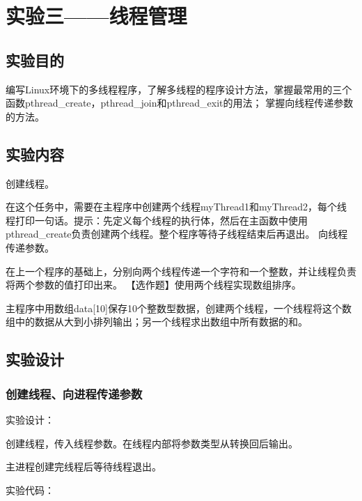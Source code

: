\documentclass{ctexrep}
\begin{document}
\chapter{实验三——线程管理}

\section{实验目的}
\begin{outline}[cenumerate]
    \1 编写Linux环境下的多线程程序，了解多线程的程序设计方法，掌握最常用的三个函数pthread_create，pthread_join和pthread_exit的用法；
    \1 掌握向线程传递参数的方法。
\end{outline}
\section{实验内容}
\begin{outline}[cenumerate]
    \1 创建线程。

在这个任务中，需要在主程序中创建两个线程myThread1和myThread2，每个线程打印一句话。提示：先定义每个线程的执行体，然后在主函数中使用pthread_create负责创建两个线程。整个程序等待子线程结束后再退出。
    \1 向线程传递参数。

    在上一个程序的基础上，分别向两个线程传递一个字符和一个整数，并让线程负责将两个参数的值打印出来。
    \1 【选作题】使用两个线程实现数组排序。

    主程序中用数组data[10]保存10个整数型数据，创建两个线程，一个线程将这个数组中的数据从大到小排列输出；另一个线程求出数组中所有数据的和。
\end{outline}
\section{实验设计}

\subsection{创建线程、向进程传递参数}

实验设计：

创建线程，传入线程参数。在线程内部将参数类型从转换回后输出。

主进程创建完线程后等待线程退出。

实验代码：
\end{document}
